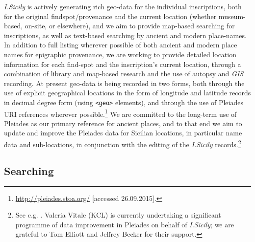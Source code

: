 \documentclass[amsthm,ebook]{saparticle}
\begin{document}
\noindent \emph{I.Sicily} is actively generating rich geo-data for the individual inscriptions, both for the original findspot/provenance
and the current location (whether museum-based, on-site, or elsewhere), and we aim to provide map-based searching for
inscriptions, as well as text-based searching by ancient and modern place-names. In addition to full listing wherever
possible of both ancient and modern place names for epigraphic provenance, we are working to provide detailed location
information for each find-spot and the inscription’s current location, through a combination of library and map-based
research and the use of autopsy and \emph{GIS} recording. At present geo-data is being recorded in two forms, both through the
use of explicit geographical locations in the form of longitude and latitude records in decimal degree form (using
\texttt{{\textless}geo{\textgreater}} elements), and through the use of Pleiades URI references wherever possible.\footnote{
\url{http://pleiades.stoa.org/} [accessed 26.09.2015].} We are committed to the long-term use of Pleiades as our primary
reference for ancient places, and to that end we aim to update and improve the Pleiades data for Sicilian locations, in
particular name data and sub-locations, in conjunction with the editing of the \emph{I.Sicily} records.\footnote{ See e.g.
\citet{wilson_places:_2015}. Valeria Vitale (KCL) is currently undertaking a significant programme of data improvement in
Pleiades on behalf of \emph{I.Sicily}; we are grateful to Tom Elliott and Jeffrey Becker for their support.}




\subsection{Searching}
\end{document}
